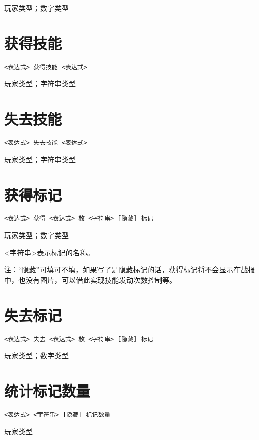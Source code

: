 玩家类型；数字类型

\section{获得技能}

\begin{verbatim}
<表达式> 获得技能 <表达式>
\end{verbatim}

玩家类型；字符串类型

\section{失去技能}

\begin{verbatim}
<表达式> 失去技能 <表达式>
\end{verbatim}

玩家类型；字符串类型

\section{获得标记}

\begin{verbatim}
<表达式> 获得 <表达式> 枚 <字符串> [隐藏] 标记
\end{verbatim}

玩家类型；数字类型

<字符串>表示标记的名称。

注：“隐藏”可填可不填，如果写了是隐藏标记的话，获得标记将不会显示在战报中，也没有图片，可以借此实现技能发动次数控制等。

\section{失去标记}

\begin{verbatim}
<表达式> 失去 <表达式> 枚 <字符串> [隐藏] 标记
\end{verbatim}

玩家类型；数字类型

\section{统计标记数量}

\begin{verbatim}
<表达式> <字符串> [隐藏] 标记数量
\end{verbatim}

玩家类型

